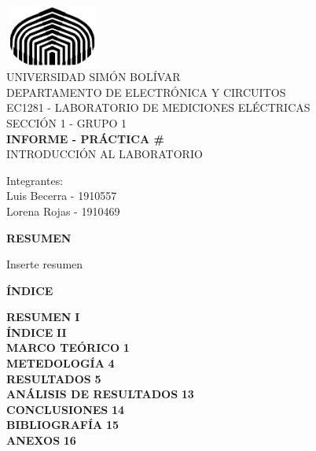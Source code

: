 \documentclass[12pt]{article}
\begin{document}
	
	\thispagestyle{empty}
	
	\begin{center}
		\includegraphics[width=3.1cm,height=2cm]{logo}\\
		UNIVERSIDAD SIMÓN BOLÍVAR\\
		DEPARTAMENTO DE ELECTRÓNICA Y CIRCUITOS\\
		EC1281 - LABORATORIO DE MEDICIONES ELÉCTRICAS\\
		SECCIÓN 1 - GRUPO 1\\
		
		\vspace{7cm}
		\textbf{\Large INFORME - PRÁCTICA \#}\\
		INTRODUCCIÓN AL LABORATORIO\\
	\end{center}
	
	\begin{flushleft}
		\vspace{9cm}
		\hfill Integrantes:\\
		\hfill {\large Luis Becerra - 1910557}\\
		\hfill {\large Lorena Rojas - 1910469}\\
	\end{flushleft}
	
	\newpage
	
	
	\begin{center}
		\textbf{\large RESUMEN}\\
	\end{center}
	
	Inserte resumen
	
	\newpage
	
	\begin{center}
		\textbf{\large ÍNDICE}\\
	\end{center}
	
	\noindent \textbf{RESUMEN} \hfill \textbf{I}\\
	\noindent \textbf{ÍNDICE} \hfill \textbf{II}\\
	\noindent \textbf{MARCO TEÓRICO} \hfill \textbf{1}\\
	\noindent \textbf{METEDOLOGÍA} \hfill \textbf{4}\\
	\noindent \textbf{RESULTADOS} \hfill \textbf{5}\\
	\noindent \textbf{ANÁLISIS DE RESULTADOS} \hfill \textbf{13}\\
	\noindent \textbf{CONCLUSIONES} \hfill \textbf{14}\\
	\noindent \textbf{BIBLIOGRAFÍA} \hfill \textbf{15}\\
	\noindent \textbf{ANEXOS} \hfill \textbf{16}\\
	
\end{document}
